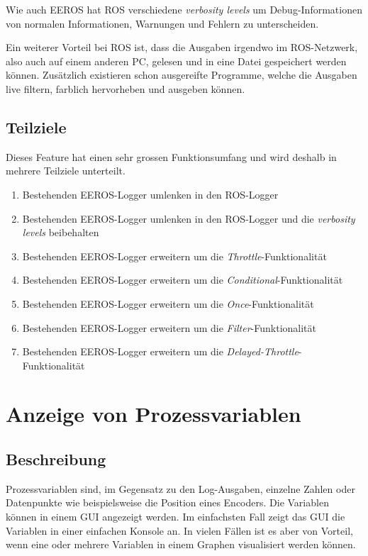 Wie auch EEROS hat ROS verschiedene \textit{verbosity levels} um Debug-Informationen von normalen Informationen, Warnungen und Fehlern zu unterscheiden.

Ein weiterer Vorteil bei ROS ist, dass die Ausgaben irgendwo im ROS-Netzwerk, also auch auf einem anderen PC, gelesen und in eine Datei gespeichert werden können.
Zusätzlich existieren schon ausgereifte Programme, welche die Ausgaben live filtern, farblich hervorheben und ausgeben können. 

\subsection{Teilziele}
Dieses Feature hat einen sehr grossen Funktionsumfang und wird deshalb in mehrere Teilziele unterteilt.
\begin{enumerate}
\item Bestehenden EEROS-Logger umlenken in den ROS-Logger
\item Bestehenden EEROS-Logger umlenken in den ROS-Logger und die \textit{verbosity levels} beibehalten
\item Bestehenden EEROS-Logger erweitern um die \textit{Throttle}-Funktionalität
\item Bestehenden EEROS-Logger erweitern um die \textit{Conditional}-Funktionalität
\item Bestehenden EEROS-Logger erweitern um die \textit{Once}-Funktionalität
\item Bestehenden EEROS-Logger erweitern um die \textit{Filter}-Funktionalität
\item Bestehenden EEROS-Logger erweitern um die \textit{Delayed-Throttle}-Funktionalität
\end{enumerate}


\section{Anzeige von Prozessvariablen}
\subsection{Beschreibung}
Prozessvariablen sind, im Gegensatz zu den Log-Ausgaben, einzelne Zahlen oder Datenpunkte wie beispielsweise die Position eines Encoders.
Die Variablen können in einem GUI angezeigt werden.
Im einfachsten Fall zeigt das GUI die Variablen in einer einfachen Konsole an.
In vielen Fällen ist es aber von Vorteil, wenn eine oder mehrere Variablen in einem Graphen visualisiert werden können.


